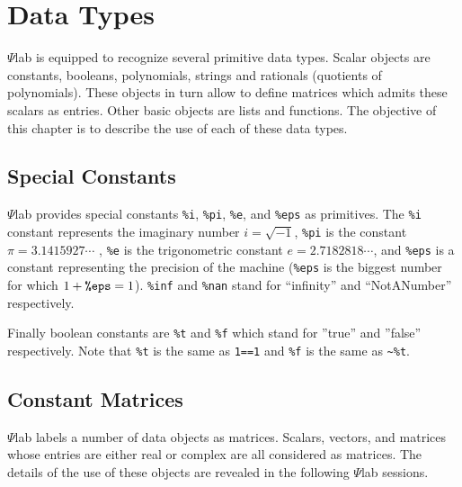 \chapter{Data Types}
\label{ch2}

	$\Psi$lab is equipped to recognize several primitive data types.
 Scalar objects are constants, booleans, polynomials, strings and 
rationals (quotients of polynomials). These objects in turn allow to 
define matrices which admits these scalars as entries.
Other basic objects are lists and functions.
%
The objective of this chapter is to describe the use of each of 
these data types.

\section{Special Constants}
\label{s2.1}

	$\Psi$lab provides special constants {\tt \%i}, {\tt \%pi},
{\tt \%e}, and {\tt \%eps} as primitives.  The {\tt \%i} constant
represents the imaginary number $i=\sqrt{-1}$, {\tt \%pi} is the
constant $\pi=3.1415927\cdots$ , {\tt \%e}
is the trigonometric constant $e=2.7182818\cdots$, and {\tt \%eps}
is a constant representing the precision of the machine ({\tt \%eps}
is the biggest number for which $1+\mbox{\tt \%eps}=1$). {\tt \%inf}
and {\tt \%nan} stand for ``infinity'' and ``NotANumber'' respectively.

Finally boolean constants are {\tt \%t} and {\tt \%f} which stand for
''true'' and ''false'' respectively. Note that {\tt \%t} is the
same as {\tt 1==1} and {\tt \%f} is the same as {\verb!~%t!}.

\section{Constant Matrices}
\label{s2.2}

	$\Psi$lab labels a number of data objects as matrices.  
Scalars, vectors, and matrices whose entries are either real or complex
are all considered as matrices.  The details of the use
of these objects are revealed in the following $\Psi$lab sessions.

